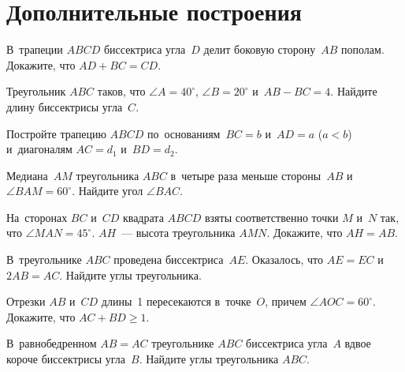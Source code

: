 
\section*{Дополнительные построения}


\begin{problems}

\item
В~трапеции $ABCD$ биссектриса угла~$D$ делит боковую сторону~$AB$ пополам.
Докажите, что $AD + BC = CD$.

\item
Треугольник $ABC$ таков, что $\angle A = 40^\circ$, $\angle B = 20^\circ$
и~$AB - BC = 4$.
Найдите длину биссектрисы угла~$C$.

\item
Постройте трапецию $ABCD$ по~основаниям~$BC = b$ и~$AD = a$ ($a < b$)
и~диагоналям $AC = d_1$ и~$BD = d_2$.

\item
Медиана~$AM$ треугольника $ABC$ в~четыре раза меньше стороны~$AB$
и~$\angle BAM = 60^\circ$.
Найдите угол $\angle BAC$.

\item
На~сторонах $BC$ и~$CD$ квадрата $ABCD$ взяты соответственно точки $M$ и~$N$
так, что $\angle MAN = 45^\circ$.
$AH$~--- высота треугольника $AMN$.
Докажите, что $AH = AB$.

\item
В~треугольнике $ABC$ проведена биссектриса~$AE$.
Оказалось, что $AE = EC$ и~$2 AB = AC$.
Найдите углы треугольника.


\item
Отрезки $AB$ и~$CD$ длины~1 пересекаются в~точке~$O$, причем
$\angle AOC = 60^\circ$.
Докажите, что $AC + BD \geq 1$.

\item
В~равнобедренном $AB = AC$ треугольнике $ABC$ биссектриса угла~$A$ вдвое
короче биссектрисы угла~$B$.
Найдите углы треугольника $ABC$.


\end{problems}


